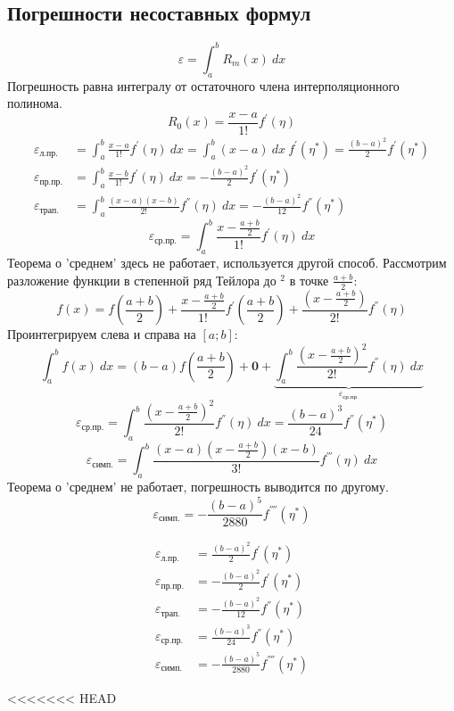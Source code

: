 \documentclass[a4paper,11pt]{article}
\begin{document}
  \subsection{Погрешности несоставных формул}
  \[\varepsilon = \int_a^b R_m(x)\ dx\]
  Погрешность равна интегралу от остаточного члена интерполяционного полинома.
  \[R_0(x) = \frac{x-a}{1!}f^{'}(\eta)\]
  \begin{align*}
    \varepsilon_{\text{л.пр.}}  &= \int_a^b \frac{x-a}{1!} f^{'}(\eta)\ dx = \int_a^b (x-a)\ dx\ f^{'}(\eta^*) = \frac{(b-a)^2}{2}f^{'}(\eta^*) \\
    \varepsilon_{\text{пр.пр.}} &= \int_a^b \frac{x-b}{1!} f^{'}(\eta)\ dx = - \frac{(b-a)^2}{2}f^{'}(\eta^*) \\
    \varepsilon_{\text{трап.}}  &= \int_a^b \frac{(x-a)(x-b)}{2!} f^{''}(\eta)\ dx = - \frac{(b-a)^2}{12}f^{''}(\eta^*)
  \end{align*}
  \[\varepsilon_{\text{ср.пр.}} = \int_a^b \frac{x-\frac{a+b}{2}}{1!} f^{'}(\eta)\ dx\]
  Теорема о 'среднем' здесь не работает, используется другой способ.
  Рассмотрим разложение функции в степенной ряд Тейлора до $^2$  в точке $\frac{a+b}{2}$:
  \[f(x) = f(\frac{a+b}{2}) + \frac{x-\frac{a+b}{2}}{1!} f^{'}(\frac{a+b}{2}) + \frac{(x-\frac{a+b}{2})}{2!} f^{''}(\eta)\]
  Проинтегрируем слева и справа на $[a; b]$:
  \[\int_a^b f(x)\ dx = (b-a)f(\frac{a+b}{2}) + \textbf{0} + \underbrace{\int_a^b \frac{(x-\frac{a+b}{2})^2}{2!} f^{''}(\eta)\ dx}_{\varepsilon_{\text{ср.пр.}}}\]
  \[\varepsilon_{\text{ср.пр.}} = \int_a^b \frac{(x-\frac{a+b}{2})^2}{2!} f^{''}(\eta)\ dx = \frac{(b-a)^3}{24}f^{''}(\eta^*)\]
  \[\varepsilon_{\text{симп.}} = \int_a^b \frac{(x-a)(x-\frac{a+b}{2})(x-b)}{3!} f^{'''}(\eta)\ dx\]
  Теорема о 'среднем' не работает, погрешность выводится по другому.
  \[\varepsilon_{\text{симп.}} = - \frac{(b-a)^5}{2880} f^{''''}(\eta^*)\]
  \begin{importantblock}
    \begin{align*}
      \varepsilon_{\text{л.пр.}}  &= \frac{(b-a)^2}{2}f^{'}(\eta^*) \\
      \varepsilon_{\text{пр.пр.}} &= - \frac{(b-a)^2}{2}f^{'}(\eta^*) \\
      \varepsilon_{\text{трап.}}  &= - \frac{(b-a)^2}{12}f^{''}(\eta^*) \\
      \varepsilon_{\text{ср.пр.}} &= \frac{(b-a)^3}{24}f^{''}(\eta^*) \\
      \varepsilon_{\text{симп.}}  &= - \frac{(b-a)^5}{2880} f^{''''}(\eta^*)
    \end{align*}
  \end{importantblock}
<<<<<<< HEAD
\end{document}
